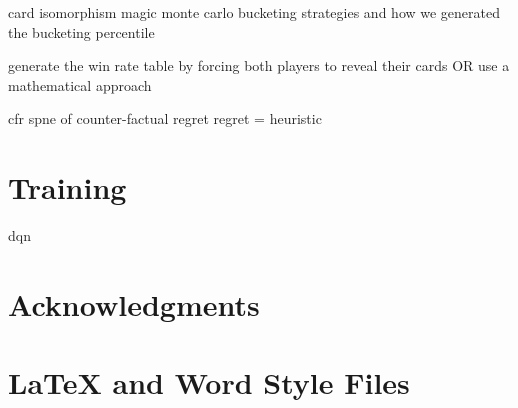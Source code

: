 \documentclass{article}
\begin{document}
card isomorphism magic
monte carlo
bucketing strategies and how we generated the bucketing
percentile

generate the win rate table by forcing both players to reveal their cards
OR use a mathematical approach

cfr
spne of counter-factual regret
regret = heuristic


\section{Training}

dqn


\section*{Acknowledgments}

\appendix

\section{\LaTeX{} and Word Style Files}\label{stylefiles}



\end{document}
